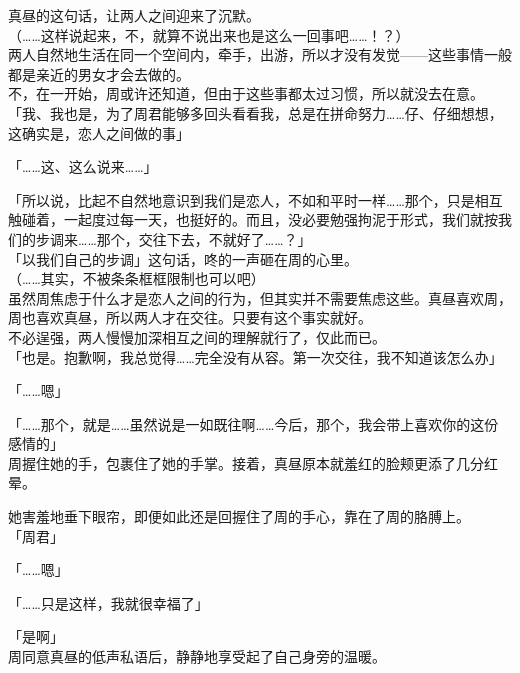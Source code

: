 真昼的这句话，让两人之间迎来了沉默。\\

（……这样说起来，不，就算不说出来也是这么一回事吧……！？）\\

两人自然地生活在同一个空间内，牵手，出游，所以才没有发觉——这些事情一般都是亲近的男女才会去做的。\\

不，在一开始，周或许还知道，但由于这些事都太过习惯，所以就没去在意。\\

「我、我也是，为了周君能够多回头看看我，总是在拼命努力……仔、仔细想想，这确实是，恋人之间做的事」

「……这、这么说来……」

「所以说，比起不自然地意识到我们是恋人，不如和平时一样……那个，只是相互触碰着，一起度过每一天，也挺好的。而且，没必要勉强拘泥于形式，我们就按我们的步调来……那个，交往下去，不就好了……？」\\

「以我们自己的步调」这句话，咚的一声砸在周的心里。\\

（……其实，不被条条框框限制也可以吧）\\

虽然周焦虑于什么才是恋人之间的行为，但其实并不需要焦虑这些。真昼喜欢周，周也喜欢真昼，所以两人才在交往。只要有这个事实就好。\\

不必逞强，两人慢慢加深相互之间的理解就行了，仅此而已。\\

「也是。抱歉啊，我总觉得……完全没有从容。第一次交往，我不知道该怎么办」

「……嗯」

「……那个，就是……虽然说是一如既往啊……今后，那个，我会带上喜欢你的这份感情的」\\

周握住她的手，包裹住了她的手掌。接着，真昼原本就羞红的脸颊更添了几分红晕。

她害羞地垂下眼帘，即便如此还是回握住了周的手心，靠在了周的胳膊上。\\

「周君」

「……嗯」

「……只是这样，我就很幸福了」

「是啊」\\

周同意真昼的低声私语后，静静地享受起了自己身旁的温暖。\\
